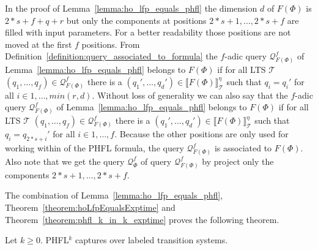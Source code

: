 \begin{remark}
In the proof of Lemma~\ref{lemma:ho_lfp_equals_phfl} the dimension $d$ of $F(\Phi)$ is $2*s+f+q+r$ but only the components at positions $2*s+1,\dots ,2*s+f$ are filled with input parameters. For a better readability those positions are not moved at the first $f$ positions.  From Definition~\ref{definition:query_associated_to_formula} the $f$-adic query $\mathcal{Q}^f_{F(\Phi)}$ of Lemma~\ref{lemma:ho_lfp_equals_phfl} belongs to $F(\Phi)$ if for all LTS $\mathcal{T}$ $(q_1, \dots, q_f) \in \mathcal{Q}^f_{F(\Phi)}$ there is a $(q_1', \dots, q_d') \in \llbracket F(\Phi) \rrbracket^\eta_\mathcal{T}$ such that $q_i = q_i'$ for all $i \in {1, \dots, min({r, d})}$. Without loss of generality we can also say that the $f$-adic query $\mathcal{Q}^f_{F(\Phi)}$ of Lemma~\ref{lemma:ho_lfp_equals_phfl} belongs to $F(\Phi)$ if for all LTS $\mathcal{T}$ $(q_1, \dots, q_f) \in \mathcal{Q}^f_{F(\Phi)}$ there is a $(q_1', \dots, q_d') \in \llbracket F(\Phi) \rrbracket^\eta_\mathcal{T}$ such that $q_i = q_{2*s+i}'$ for all $i \in {1, \dots, f}$. Because the other positions are only used for working within of the PHFL formula, the query $\mathcal{Q}^f_{F(\Phi)}$ is associated to $F(\Phi)$. Also note that we get the query $\mathcal{Q}^f_{\Phi}$ of query $\mathcal{Q}^f_{F(\Phi)}$ by project only the components $2*s+1,\dots ,2*s+f$. 
\end{remark}

The combination of Lemma~\ref{lemma:ho_lfp_equals_phfl}, Theorem~\ref{theorem:hoLfpEqualsExptime} and
Theorem~\ref{theorem:phfl_k_in_k_exptime} proves the following theorem.

\begin{theorem}
    Let $k \geq 0$. PHFL$^k$ captures  over labeled transition systems.
\end{theorem}

